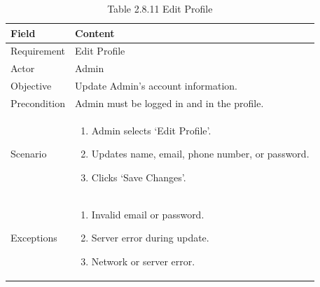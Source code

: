 \documentclass[12pt,oneside]{report}
\begin{document}
\begin{table}[H]
\centering
\caption{Table 2.8.11 Edit Profile}
\label{tab:admin-edit-profile}
\begin{tabularx}{\textwidth}{|p{3cm}|X|}
\hline
\textbf{Field} & \textbf{Content} \\ \hline

Requirement & Edit Profile \\ \hline

Actor & Admin \\ \hline

Objective & Update Admin’s account information. \\ \hline

Precondition & Admin must be logged in and in the profile. \\ \hline

Scenario & 
\begin{minipage}[t]{0.75\textwidth}
\begin{enumerate}[leftmargin=*,label=\arabic*.]
\item Admin selects ‘Edit Profile’.
\item Updates name, email, phone number, or password.
\item Clicks ‘Save Changes’.
\end{enumerate}
\end{minipage} \\ \hline

Exceptions & 
\begin{minipage}[t]{0.75\textwidth}
\begin{enumerate}[leftmargin=*,label=\arabic*.]
\item Invalid email or password.
\item Server error during update.
\item Network or server error.
\end{enumerate}
\end{minipage} \\ \hline

\end{tabularx}
\end{table}
\end{document}
